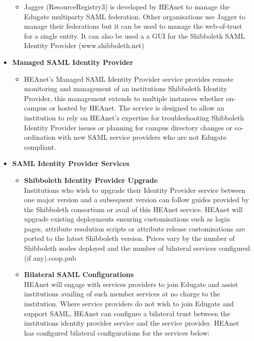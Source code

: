 \documentclass{article}
\begin{document}
\begin{itemize}
\begin{itemize}
	      	\item 	Jagger (ResourceRegistry3) is developed by HEAnet to manage the Edugate multiparty SAML federation. Other organisations use Jagger to manage their federations but it can be used to manage the web-of-trust for a single entity. It can also be used a a GUI for the Shibboleth SAML Identity Provider (www.shibboleth.net)
	      \end{itemize}
	\item \textbf{Managed SAML Identity Provider}
	      \begin{itemize}
	      	\item HEAnet's Managed SAML Identity Provider service provides remote monitoring and management of an institutions Shibboleth Identity Provider, this management extends to multiple instances whether on-campus or hosted by HEAnet. The service is designed to allow an institution to rely on HEAnet's expertise for troubleshooting Shibboleth Identity Provider issues or planning for campus directory changes or co-ordination with new SAML service providers who are not Edugate compliant.
	      \end{itemize}
	      \newpage
	\item \textbf{SAML Identity Provider Services}
	      \begin{itemize}
	      	\item \textbf{Shibboleth Identity Provider Upgrade}\\
	      	      Institutions who wish to upgrade their Identity Provider service between one major version and a subsequent version can follow guides provided by the Shibboleth consortium or avail of this HEAnet service. HEAnet will upgrade existing deployments ensuring customisations such as login pages, attribute resolution scripts or attribute release customisations are ported to the latest Shibboleth version. Prices vary by the number of Shibboleth nodes deployed and the number of bilateral services configured (if any).coop.pub
	      	\item \textbf{Bilateral SAML Configurations}\\
	      	      HEAnet will engage with services providers to join Edugate and assist institutions availing of such member services at no charge to the institution. Where service providers do not wish to join Edugate and support SAML, HEAnet can configure a bilateral trust between the institutions identity provider service and the service provider. HEAnet has configured bilateral configurations for the services below:
	      	      \begin{itemize}

\end{itemize}
\end{itemize}
\end{itemize}
\end{document}
